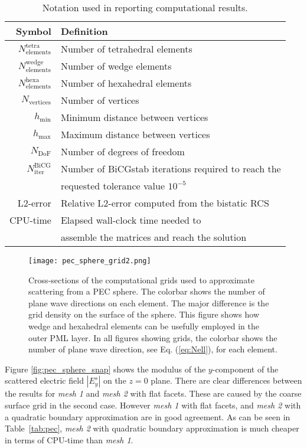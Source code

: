 \documentclass[a4paper,12pt]{article}
\newcommand{\Nt}{N_{\mathrm{elements}}^{\mathrm{tetra}}}
\newcommand{\Nw}{N_{\mathrm{elements}}^{\mathrm{wedge}}}
\newcommand{\Nh}{N_{\mathrm{elements}}^{\mathrm{hexa}}}
\newcommand{\Nv}{N_{\mathrm{vertices}}}
\newcommand{\Ndof}{N_{\mathrm{DoF}}}
\begin{document}
\begin{table}[!htb]
    \caption{Notation used in reporting computational results.}
    \centering
    \begin{tabular}{r|l}
    Symbol & Definition\\\hline
        $\Nt$ & Number of tetrahedral elements\\
        $\Nw$ & Number of wedge elements\\
        $\Nh$ & Number of hexahedral elements\\
        $\Nv$ & Number of vertices\\
        $h_{\min}$  & Minimum distance between vertices\\
        $h_{\max}$  & Maximum distance between vertices\\
        $\Ndof$ & Number of degrees of freedom\\
        $N_{{\mathrm{iter}}}^{{\mathrm{BiCG}}}$ &Number of BiCGstab iterations required to reach the \\&requested tolerance value $10^{-5}$\\
        L2-error & Relative L2-error computed from the bistatic RCS \\
        CPU-time & Elapsed wall-clock time needed to \\&assemble the matrices and reach the solution 
    \end{tabular}
    \label{not}
\end{table}

\begin{figure}[!htb]
    \centering
    \texttt{[image: pec\_sphere\_grid2.png]} 
\caption{Cross-sections of the computational grids used to approximate scattering from a PEC sphere. The colorbar shows the number of plane wave  directions on each element.  The major difference is the grid density on the surface of the 
sphere.  This figure shows how wedge and hexahedral elements can be usefully employed in  the outer PML layer. In all figures showing grids, the colorbar shows the number of plane wave direction, see Eq. (\ref{eq:Nell}), for each element. }
    \label{fig:pec_sphere_grid}
\end{figure}

Figure \ref{fig:pec_sphere_snap} shows the modulus of the $y$-component of the scattered electric field $|E_y^s|$ on the $z=0$ plane.  There are clear differences between the results for \emph{mesh 1} and \emph{mesh 2} with flat facets.  These are caused by the coarse surface grid in the second case.  However \emph{mesh 1} with flat facets, and \emph{mesh 2} with a quadratic boundary approximation are in good agreement. As can be seen in Table~\ref{tab:pec}, \emph{mesh 2} with quadratic boundary approximation is much cheaper in terms of CPU-time than \emph{mesh 1}.
\end{document}
